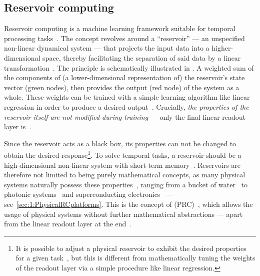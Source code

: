 \subsection{Reservoir computing}
Reservoir computing is a machine learning framework suitable for temporal processing tasks~\cite{BookReservoirComputing}.
The concept revolves around a ``reservoir'' --- an unspecified non-linear dynamical system --- that projects the input data into a higher-dimensional space, thereby facilitating the separation of said data by a linear transformation~\cite{appeltant2011information,KUR-24,RC_ASI}. %
The principle is schematically illustrated in .
A weighted sum of the components of (a lower-dimensional representation of) the reservoir's state vector (green nodes), then provides the output (red node) of the system as a whole. %
These weights can be trained with a simple learning algorithm like linear regression in order to produce a desired output~\cite{RC_RecentAdvances, RC_SuperconductingElectronics}.
Crucially, \textit{the properties of the reservoir itself are not modified during training} --- only the final linear readout layer is~\cite{RC_ASI,DynamicEmergence_NanomagneticSystem}. \par
Since the reservoir acts as a black box, its properties can not be changed to obtain the desired response\footnote{
	It is possible to adjust a physical reservoir to exhibit the desired properties for a given task~\cite{AdaptiveProgrammableRC,gartside2022reconfigurable}, but this is different from mathematically tuning the weights of the readout layer via a simple procedure like linear regression.
}.
To solve temporal tasks, a reservoir should be a high-dimensional non-linear system with short-term memory~\cite{NeuromorphicAFMspintronics,RC_RecentAdvances}.
Reservoirs are therefore not limited to being purely mathematical concepts, as many physical systems naturally possess these properties~\cite{RC_DipoleNanomagnets,RC_PassiveFrustratedNM,RC_ASI,RC_RecentAdvances,NeuromorphicOscillators,VowelRecognition4STO,RC_DiffusiveMemristors,RC_MemristorTemporal,gartside2022reconfigurable}, ranging from a bucket of water~\cite{PatternRecognition_Bucket} to photonic systems~\cite{RC_Photonic} and superconducting electronics~\cite{RC_SuperconductingElectronics} --- see~\cref{sec:1:PhysicalRCplatforms}.
This is the concept of  (PRC)~\cite{PRC}, which allows the usage of physical systems without further mathematical abstractions --- apart from the linear readout layer at the end~\cite{RC_RecentAdvances}. \par

